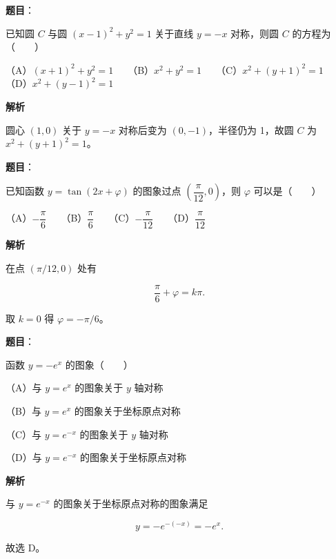 \begin{answer}

\textbf{题目}：

已知圆 $C$ 与圆 $(x-1)^2+y^2=1$ 关于直线 $y=-x$ 对称，则圆 $C$ 的方程为\mbox{（　　）}

（A）$(x+1)^2+y^2=1$　　（B）$x^2+y^2=1$　　（C）$x^2+(y+1)^2=1$　　（D）$x^2+(y-1)^2=1$

\textbf{解析}

圆心 $(1,0)$ 关于 $y=-x$ 对称后变为 $(0,-1)$，半径仍为 1，故圆 $C$ 为 $x^2+(y+1)^2=1$。


\end{answer}
\begin{answer}

\textbf{题目}：

已知函数 $y=\tan(2x+\varphi)$ 的图象过点 $\left(\dfrac\pi{12},0\right)$，则 $\varphi$ 可以是\mbox{（　　）}

（A）$-\dfrac\pi6$　　（B）$\dfrac\pi6$　　（C）$-\dfrac\pi{12}$　　（D）$\dfrac\pi{12}$

\textbf{解析}

在点 $\left(\pi/12,0\right)$ 处有

\nopagebreak[4]
\[
\frac\pi6+\varphi=k\pi.
\]

取 $k=0$ 得 $\varphi=-\pi/6$。


\end{answer}
\begin{answer}

\textbf{题目}：

函数 $y=-e^x$ 的图象\mbox{（　　）}

（A）与 $y=e^x$ 的图象关于 $y$ 轴对称

（B）与 $y=e^x$ 的图象关于坐标原点对称

（C）与 $y=e^{-x}$ 的图象关于 $y$ 轴对称

（D）与 $y=e^{-x}$ 的图象关于坐标原点对称

\textbf{解析}

与 $y=e^{-x}$ 的图象关于坐标原点对称的图象满足

\nopagebreak[4]
\[
y=-e^{-(-x)}=-e^x.
\]

故选 D。


\end{answer}
